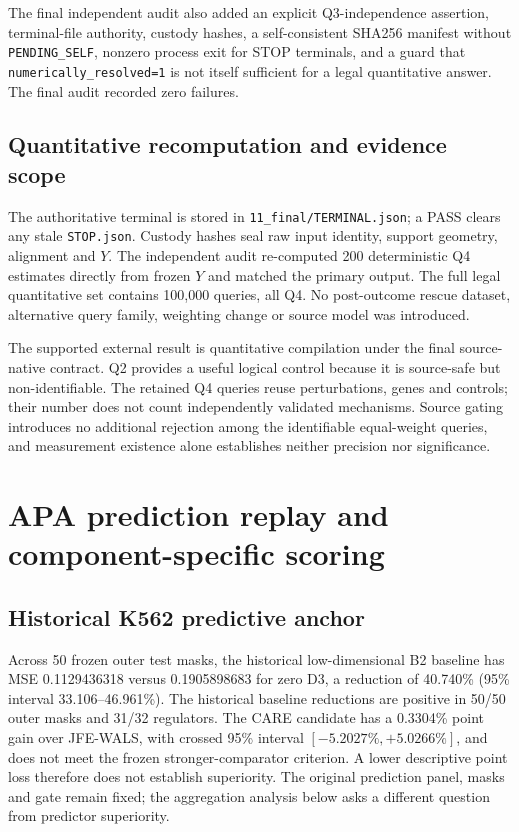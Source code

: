 \documentclass[11pt]{article}
\begin{document}
The final independent audit also added an explicit Q3-independence assertion, terminal-file authority, custody hashes, a self-consistent SHA256 manifest without \texttt{PENDING\_SELF}, nonzero process exit for STOP terminals, and a guard that \texttt{numerically\_resolved=1} is not itself sufficient for a legal quantitative answer. The final audit recorded zero failures.


\subsection{Quantitative recomputation and evidence scope}
The authoritative terminal is stored in \texttt{11\_final/TERMINAL.json}; a PASS clears any stale \texttt{STOP.json}. Custody hashes seal raw input identity, support geometry, alignment and $Y$. The independent audit re-computed 200 deterministic Q4 estimates directly from frozen $Y$ and matched the primary output. The full legal quantitative set contains 100,000 queries, all Q4. No post-outcome rescue dataset, alternative query family, weighting change or source model was introduced.

The supported external result is quantitative compilation under the final source-native contract. Q2 provides a useful logical control because it is source-safe but non-identifiable. The retained Q4 queries reuse perturbations, genes and controls; their number does not count independently validated mechanisms. Source gating introduces no additional rejection among the identifiable equal-weight queries, and measurement existence alone establishes neither precision nor significance.



\section{APA prediction replay and component-specific scoring}


\subsection{Historical K562 predictive anchor}
Across 50 frozen outer test masks, the historical low-dimensional B2 baseline has MSE 0.1129436318 versus 0.1905898683 for zero D3, a reduction of 40.740\% (95\% interval 33.106--46.961\%). The historical baseline reductions are positive in 50/50 outer masks and 31/32 regulators. The CARE candidate has a 0.3304\% point gain over JFE-WALS, with crossed 95\% interval $[-5.2027\%,+5.0266\%]$, and does not meet the frozen stronger-comparator criterion. A lower descriptive point loss therefore does not establish superiority. The original prediction panel, masks and gate remain fixed; the aggregation analysis below asks a different question from predictor superiority.
\end{document}
